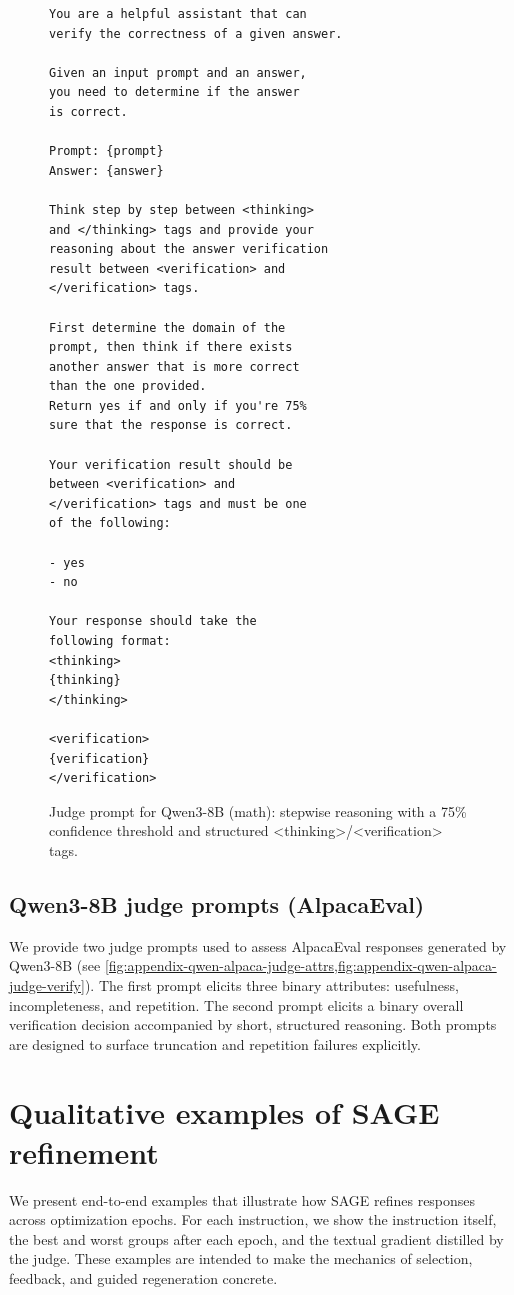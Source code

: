 \documentclass[letterpaper]{article} %
\newcommand{\method}{SAGE}
\begin{document}
\begin{figure}[htbp]
\centering
\begin{minipage}{\linewidth}
\begin{small}
\begin{verbatim}
You are a helpful assistant that can
verify the correctness of a given answer.

Given an input prompt and an answer,
you need to determine if the answer
is correct.

Prompt: {prompt}
Answer: {answer}

Think step by step between <thinking>
and </thinking> tags and provide your
reasoning about the answer verification
result between <verification> and
</verification> tags.

First determine the domain of the
prompt, then think if there exists
another answer that is more correct
than the one provided.
Return yes if and only if you're 75%
sure that the response is correct.

Your verification result should be
between <verification> and
</verification> tags and must be one
of the following:

- yes
- no

Your response should take the
following format:
<thinking>
{thinking}
</thinking>

<verification>
{verification}
</verification>
\end{verbatim}
\end{small}
\end{minipage}
\caption{Judge prompt for Qwen3-8B (math): stepwise reasoning with a 75\% confidence threshold and structured <thinking>/<verification> tags.}
\label{fig:appendix-qwen-math-judge}
\end{figure}

\subsection{Qwen3-8B judge prompts (AlpacaEval)}
We provide two judge prompts used to assess AlpacaEval responses generated by Qwen3-8B (see \cref{fig:appendix-qwen-alpaca-judge-attrs,fig:appendix-qwen-alpaca-judge-verify}). The first prompt elicits three binary attributes: usefulness, incompleteness, and repetition. The second prompt elicits a binary overall verification decision accompanied by short, structured reasoning. Both prompts are designed to surface truncation and repetition failures explicitly.

\section{Qualitative examples of SAGE refinement}
We present end-to-end examples that illustrate how \method{} refines responses across optimization epochs. For each instruction, we show the instruction itself, the best and worst groups after each epoch, and the textual gradient distilled by the judge. These examples are intended to make the mechanics of selection, feedback, and guided regeneration concrete.
\end{document}
